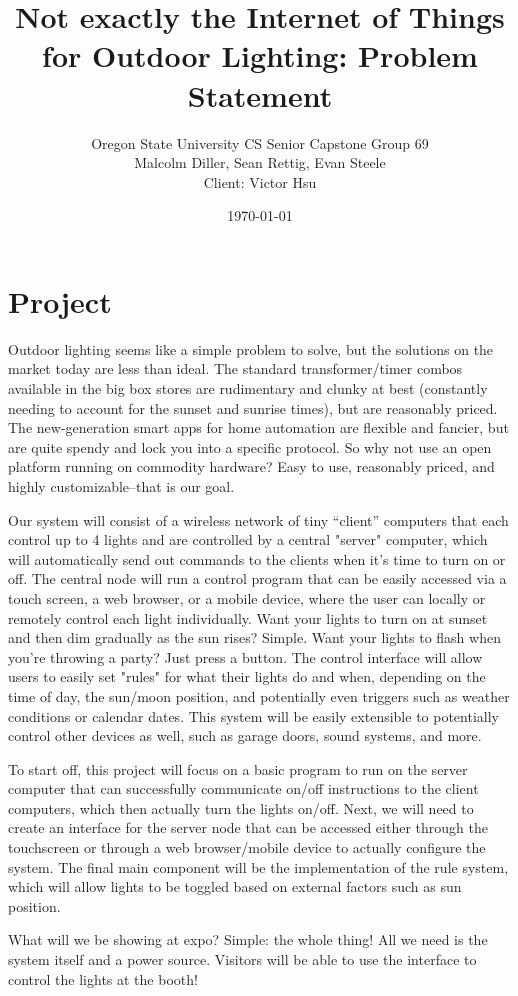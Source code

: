 \documentclass{article}
\title{Not exactly the Internet of Things for Outdoor Lighting: Problem Statement}
\author{Oregon State University CS Senior Capstone Group 69\\Malcolm Diller, Sean Rettig, Evan Steele\\Client: Victor Hsu}
\date{\today}
\begin{document}
\maketitle

\section{Project}

Outdoor lighting seems like a simple problem to solve, but the solutions on the
market today are less than ideal.  The standard transformer/timer combos
available in the big box stores are rudimentary and clunky at best (constantly
needing to account for the sunset and sunrise times), but are reasonably
priced. The new-generation smart apps for home automation are flexible and
fancier, but are quite spendy and lock you into a specific protocol.  So why
not use an open platform running on commodity hardware?  Easy to use,
reasonably priced, and highly customizable--that is our goal.

Our system will consist of a wireless network of tiny “client” computers that
each control up to 4 lights and are controlled by a central "server" computer,
which will automatically send out commands to the clients when it's time to
turn on or off.  The central node will run a control program that can be easily
accessed via a touch screen, a web browser, or a mobile device, where the user
can locally or remotely control each light individually.  Want your lights to
turn on at sunset and then dim gradually as the sun rises?  Simple.  Want your
lights to flash when you're throwing a party?  Just press a button.  The
control interface will allow users to easily set "rules" for what their lights
do and when, depending on the time of day, the sun/moon position, and
potentially even triggers such as weather conditions or calendar dates.  This
system will be easily extensible to potentially control other devices as well,
such as garage doors, sound systems, and more.

To start off, this project will focus on a basic program to run on the server
computer that can successfully communicate on/off instructions to the client
computers, which then actually turn the lights on/off.  Next, we will need to
create an interface for the server node that can be accessed either through the
touchscreen or through a web browser/mobile device to actually configure the
system.  The final main component will be the implementation of the rule
system, which will allow lights to be toggled based on external factors such as
sun position.

What will we be showing at expo?  Simple: the whole thing!  All we need is the
system itself and a power source.  Visitors will be able to use the interface
to control the lights at the booth!
\end{document}
